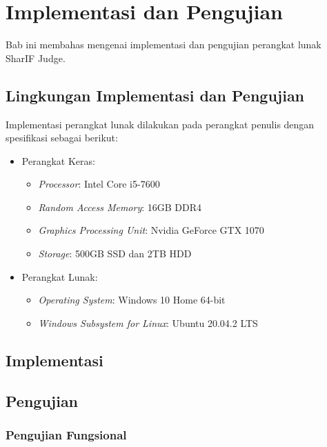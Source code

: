 \chapter{Implementasi dan Pengujian}
\label{chap:implementasidanpengujian}

Bab ini membahas mengenai implementasi dan pengujian perangkat lunak SharIF Judge.

\section{Lingkungan Implementasi dan Pengujian}
\label{sec:5:lingkungan}

Implementasi perangkat lunak dilakukan pada perangkat penulis dengan spesifikasi sebagai berikut:

\begin{itemize}
    \item Perangkat Keras:
    \begin{itemize}
        \item \textit{Processor}: Intel Core i5-7600
        \item \textit{Random Access Memory}: 16GB DDR4
        \item \textit{Graphics Processing Unit}: Nvidia GeForce GTX 1070
        \item \textit{Storage}: 500GB SSD dan 2TB HDD
    \end{itemize}
        \item Perangkat Lunak:
    \begin{itemize}
        \item \textit{Operating System}: Windows 10 Home 64-bit
        \item \textit{Windows Subsystem for Linux}: Ubuntu 20.04.2 LTS
    \end{itemize}
\end{itemize}

\section{Implementasi}
\label{sec:5:implementasi}

\section{Pengujian}
\label{sec:5:pengujian}

\subsection{Pengujian Fungsional}
\label{subsec:5:fungsional}

